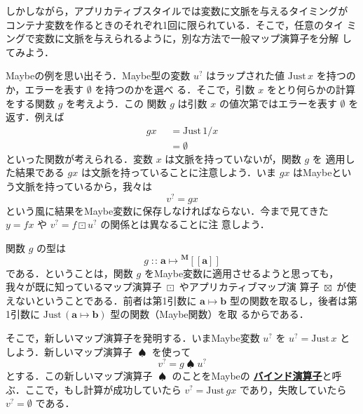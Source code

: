 \documentclass[a5paper,twoside,fleqn,draft]{jsbook}
\newcommand{\TK}[1]{\mask{\textbf{TK:}~#1}{C}}
\def\[{[\![}
\def\]{]\!]}
\newcommand{\keyword}[1]{{\underline{\textbf{#1}}}}
\newcommand{\mKeyword}[1]{\mathsf{#1}}
\newcommand{\mOtherwiseKeyword}{\mKeyword{otherwise}}
\DeclareMathOperator{\mOtherwise}{\mOtherwiseKeyword}
\newcommand{\mNothing}{\emptyset}
\DeclareMathOperator{\mAppMapMaybe}{\boxtimes}
\DeclareMathOperator{\mBindMaybe}{\spadesuit}
\DeclareMathOperator{\mIn}{{:\!:}}
\DeclareMathOperator{\mMapMaybe}{\boxdot}
\DeclareMathOperator{\mMapsTo}{\mapsto}
\newcommand{\mType}[1]{\mathbf{#1}} %
\newcommand{\mA}{\mType{a}}
\newcommand{\mB}{\mType{b}}
\newcommand{\mTypeAssemble}[2]{{}^\mType{#1}\[\mType{#2}\]}
\newcommand{\mMaybeType}[1]{\mTypeAssemble{M}{#1}}
\newcommand{\mValueConstructor}[1]{\mathrm{#1}}
\newcommand{\mValueWith}[2]{\mValueConstructor{#1}\,#2}
\newcommand{\mJustWith}[1]{\mValueWith{Just}{#1}}
\newcommand{\mMaybe}[1]{{#1}^?}
\newcommand{\mGuard}[1]{\mathop{\mid_{#1}}}
\newcommand{\mProjEXP}[2]{#1\mMapsTo#2} %
\begin{document}
しかしながら，アプリカティブスタイルでは変数に文脈を与えるタイミングが
コンテナ変数を作るときのそれぞれ1回に限られている．そこで，任意のタイ
ミングで変数に文脈を与えられるように，別な方法で一般マップ演算子を分解
してみよう．

Maybeの例を思い出そう．Maybe型の変数 $\mMaybe{u}$ はラップされた値
$\mJustWith{x}$ を持つのか，エラーを表す $\mNothing$ を持つのかを選べ
る．そこで，引数 $x$ をとり何らかの計算をする関数 $g$ を考えよう．この
関数 $g$ は引数 $x$ の値次第ではエラーを表す $\mNothing$ を返す．例えば
\begin{equation}
  \begin{aligned}
    gx&\mGuard{x\neq0}=\mJustWith{1/x}\\
    &\mGuard{\mOtherwise}=\mNothing
  \end{aligned}
\end{equation}
といった関数が考えられる．変数 $x$ は文脈を持っていないが，関数 $g$ を
適用した結果である $gx$ は文脈を持っていることに注意しよう．いま $gx$
はMaybeという文脈を持っているから，我々は
\begin{equation}
\mMaybe{v}=gx
\end{equation}
という風に結果をMaybe変数に保存しなければならない．今まで見てきた
$y=fx$ や $\mMaybe{v}=f\mMapMaybe\mMaybe{u}$ の関係とは異なることに注
意しよう．

\TK{Poor flow.}

関数 $g$ の型は
\begin{equation}
  g\mIn\mProjEXP{\mA }{\mMaybeType{a}}
\end{equation}
である．ということは，関数 $g$ をMaybe変数に適用させるようと思っても，
我々が既に知っているマップ演算子 $\mMapMaybe$ やアプリカティブマップ演
算子 $\mAppMapMaybe$ が使えないということである．前者は第1引数に
$\mProjEXP{\mA }{\mB }$ 型の関数を取るし，後者は第1引数に
$\mJustWith{(\mProjEXP{\mA }{\mB })}$ 型の関数（Maybe関数）を取
るからである．


そこで，新しいマップ演算子を発明する．いまMaybe変数 $\mMaybe{u}$ を
$\mMaybe{u}=\mJustWith{x}$ としよう．新しいマップ演算子 $\mBindMaybe$
を使って
\begin{equation}
  \mMaybe{v}=g\mBindMaybe\mMaybe{u}
\end{equation}
とする．この新しいマップ演算子 $\mBindMaybe$ のことをMaybeの
\keyword{バインド演算子}と呼ぶ．ここで，もし計算が成功していたら
$\mMaybe{v}=\mJustWith{gx}$ であり，失敗していたら
$\mMaybe{v}=\mNothing$ である．
\end{document}
